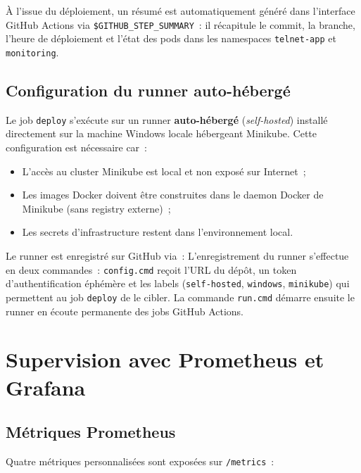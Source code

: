À l'issue du déploiement, un résumé est automatiquement généré dans
l'interface GitHub Actions via \texttt{\$GITHUB\_STEP\_SUMMARY}~: il
récapitule le commit, la branche, l'heure de déploiement et l'état
des pods dans les namespaces \texttt{telnet-app} et \texttt{monitoring}.

\subsection{Configuration du runner auto-hébergé}

Le job \texttt{deploy} s'exécute sur un runner \textbf{auto-hébergé}
(\textit{self-hosted}) installé directement sur la machine Windows locale
hébergeant Minikube. Cette configuration est nécessaire car~:
\begin{itemize}
  \item L'accès au cluster Minikube est local et non exposé sur Internet~;
  \item Les images Docker doivent être construites dans le daemon Docker
        de Minikube (sans registry externe)~;
  \item Les secrets d'infrastructure restent dans l'environnement local.
\end{itemize}

Le runner est enregistré sur GitHub via~:
L'enregistrement du runner s'effectue en deux commandes~: \texttt{config.cmd}
reçoit l'URL du dépôt, un token d'authentification éphémère et les labels
(\texttt{self-hosted}, \texttt{windows}, \texttt{minikube}) qui permettent au
job \texttt{deploy} de le cibler. La commande \texttt{run.cmd} démarre ensuite
le runner en écoute permanente des jobs GitHub Actions.

\section{Supervision avec Prometheus et Grafana}

\subsection{Métriques Prometheus}

Quatre métriques personnalisées sont exposées sur \texttt{/metrics}~:


